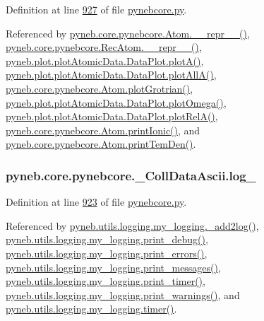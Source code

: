 Definition at line \hyperlink{pynebcore_8py_source_l00927}{927} of file \hyperlink{pynebcore_8py_source}{pynebcore.\-py}.



Referenced by \hyperlink{pynebcore_8py_source_l02615}{pyneb.\-core.\-pynebcore.\-Atom.\-\_\-\-\_\-repr\-\_\-\-\_\-()}, \hyperlink{pynebcore_8py_source_l03154}{pyneb.\-core.\-pynebcore.\-Rec\-Atom.\-\_\-\-\_\-repr\-\_\-\-\_\-()}, \hyperlink{plot_atomic_data_8py_source_l00117}{pyneb.\-plot.\-plot\-Atomic\-Data.\-Data\-Plot.\-plot\-A()}, \hyperlink{plot_atomic_data_8py_source_l00189}{pyneb.\-plot.\-plot\-Atomic\-Data.\-Data\-Plot.\-plot\-All\-A()}, \hyperlink{pynebcore_8py_source_l02443}{pyneb.\-core.\-pynebcore.\-Atom.\-plot\-Grotrian()}, \hyperlink{plot_atomic_data_8py_source_l00373}{pyneb.\-plot.\-plot\-Atomic\-Data.\-Data\-Plot.\-plot\-Omega()}, \hyperlink{plot_atomic_data_8py_source_l00262}{pyneb.\-plot.\-plot\-Atomic\-Data.\-Data\-Plot.\-plot\-Rel\-A()}, \hyperlink{pynebcore_8py_source_l02233}{pyneb.\-core.\-pynebcore.\-Atom.\-print\-Ionic()}, and \hyperlink{pynebcore_8py_source_l02324}{pyneb.\-core.\-pynebcore.\-Atom.\-print\-Tem\-Den()}.

\hypertarget{classpyneb_1_1core_1_1pynebcore_1_1___coll_data_ascii_a9277c108416ceb0bbdca484a4a246b5c}{
\subsubsection[{log\-\_\-}]{\setlength{\rightskip}{0pt plus 5cm}pyneb.\-core.\-pynebcore.\-\_\-\-Coll\-Data\-Ascii.\-log\-\_\-}}\label{classpyneb_1_1core_1_1pynebcore_1_1___coll_data_ascii_a9277c108416ceb0bbdca484a4a246b5c}


Definition at line \hyperlink{pynebcore_8py_source_l00923}{923} of file \hyperlink{pynebcore_8py_source}{pynebcore.\-py}.



Referenced by \hyperlink{logging_8py_source_l00059}{pyneb.\-utils.\-logging.\-my\-\_\-logging.\-\_\-add2log()}, \hyperlink{logging_8py_source_l00157}{pyneb.\-utils.\-logging.\-my\-\_\-logging.\-print\-\_\-debug()}, \hyperlink{logging_8py_source_l00149}{pyneb.\-utils.\-logging.\-my\-\_\-logging.\-print\-\_\-errors()}, \hyperlink{logging_8py_source_l00133}{pyneb.\-utils.\-logging.\-my\-\_\-logging.\-print\-\_\-messages()}, \hyperlink{logging_8py_source_l00165}{pyneb.\-utils.\-logging.\-my\-\_\-logging.\-print\-\_\-timer()}, \hyperlink{logging_8py_source_l00141}{pyneb.\-utils.\-logging.\-my\-\_\-logging.\-print\-\_\-warnings()}, and \hyperlink{logging_8py_source_l00115}{pyneb.\-utils.\-logging.\-my\-\_\-logging.\-timer()}.


